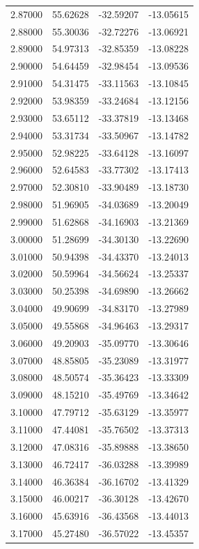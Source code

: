 \begin{table}
\begin{tabular}{llll}
2.87000 & 55.62628 & -32.59207 & -13.05615 \\
2.88000 & 55.30036 & -32.72276 & -13.06921 \\
2.89000 & 54.97313 & -32.85359 & -13.08228 \\
2.90000 & 54.64459 & -32.98454 & -13.09536 \\
2.91000 & 54.31475 & -33.11563 & -13.10845 \\
2.92000 & 53.98359 & -33.24684 & -13.12156 \\
2.93000 & 53.65112 & -33.37819 & -13.13468 \\
2.94000 & 53.31734 & -33.50967 & -13.14782 \\
2.95000 & 52.98225 & -33.64128 & -13.16097 \\
2.96000 & 52.64583 & -33.77302 & -13.17413 \\
2.97000 & 52.30810 & -33.90489 & -13.18730 \\
2.98000 & 51.96905 & -34.03689 & -13.20049 \\
2.99000 & 51.62868 & -34.16903 & -13.21369 \\
3.00000 & 51.28699 & -34.30130 & -13.22690 \\
3.01000 & 50.94398 & -34.43370 & -13.24013 \\
3.02000 & 50.59964 & -34.56624 & -13.25337 \\
3.03000 & 50.25398 & -34.69890 & -13.26662 \\
3.04000 & 49.90699 & -34.83170 & -13.27989 \\
3.05000 & 49.55868 & -34.96463 & -13.29317 \\
3.06000 & 49.20903 & -35.09770 & -13.30646 \\
3.07000 & 48.85805 & -35.23089 & -13.31977 \\
3.08000 & 48.50574 & -35.36423 & -13.33309 \\
3.09000 & 48.15210 & -35.49769 & -13.34642 \\
3.10000 & 47.79712 & -35.63129 & -13.35977 \\
3.11000 & 47.44081 & -35.76502 & -13.37313 \\
3.12000 & 47.08316 & -35.89888 & -13.38650 \\
3.13000 & 46.72417 & -36.03288 & -13.39989 \\
3.14000 & 46.36384 & -36.16702 & -13.41329 \\
3.15000 & 46.00217 & -36.30128 & -13.42670 \\
3.16000 & 45.63916 & -36.43568 & -13.44013 \\
3.17000 & 45.27480 & -36.57022 & -13.45357 \\

\end{tabular}
\end{table}
